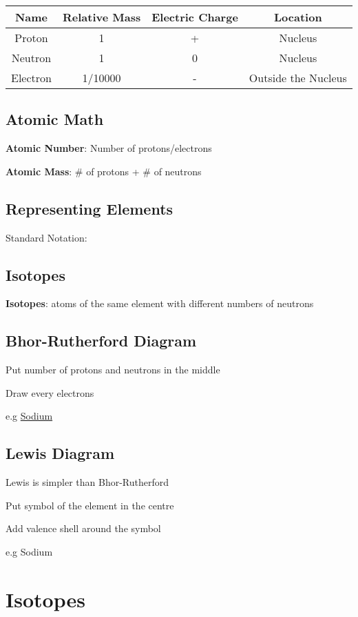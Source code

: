\documentclass[12pt]{article}
\begin{document}
\begin{tabular}{c|c|c|c}
    Name&Relative Mass&Electric Charge&Location\\
    \hline
    Proton&1&+&Nucleus\\
    Neutron&1&0&Nucleus\\
    Electron&1/10000&-&Outside the Nucleus\\
\end{tabular}
\subsection{Atomic Math}

\textbf{Atomic Number}: Number of protons/electrons

\textbf{Atomic Mass}: \# of protons + \# of neutrons
\subsection{Representing Elements}

Standard Notation: 

\subsection{Isotopes}

\textbf{Isotopes}: atoms of the same element with different numbers of neutrons

\subsection{Bhor-Rutherford Diagram}

Put number of protons and neutrons in the middle

Draw every electrons

e.g \href{https://d2jmvrsizmvf4x.cloudfront.net/BOV8bU6eSfuqDVGVKVbg_atomic_structure_of_sodium.jpg}{Sodium}

\subsection{Lewis Diagram}

Lewis is simpler than Bhor-Rutherford

Put symbol of the element in the centre

Add valence shell around the symbol

e.g Sodium


\section{Isotopes}
\end{document}
